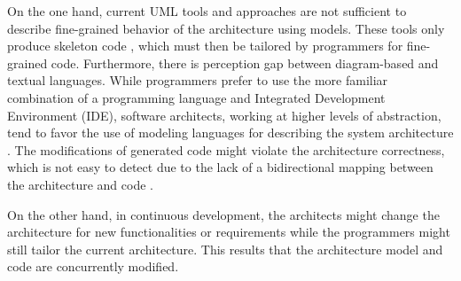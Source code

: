 

On the one hand, current UML tools and approaches are not sufficient to describe fine-grained behavior of the architecture using models. 
These tools only produce skeleton code \cite{zheng2013classification}, which must then be tailored by programmers for fine-grained code. 
Furthermore, there is perception gap between diagram-based and textual languages.
While programmers prefer to use the more familiar combination of a programming language and Integrated Development Environment (IDE), software architects, working at higher levels of abstraction, tend to favor the use of modeling languages for describing the system architecture \cite{foster2016}.
The modifications of generated code might violate the architecture correctness, which is not easy to detect due to the lack of a bidirectional mapping between the architecture and code \cite{ubayashi2010archface}.

On the other hand, in continuous development, the architects might change the architecture for new functionalities or requirements while the programmers might still tailor the current architecture. This results that the architecture model and code are concurrently modified. 




